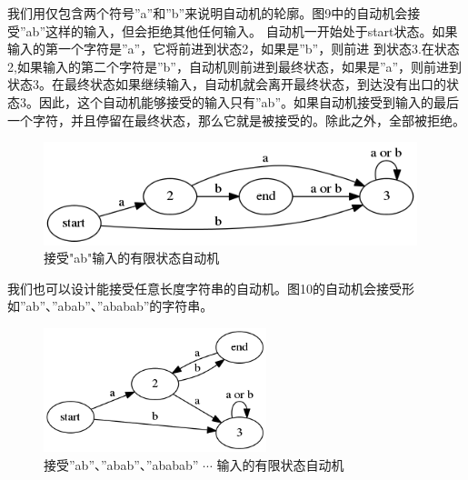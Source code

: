 \documentclass[a4paper]{article}
\begin{document}
\begin{CJK}{UTF8}{gbsn}
我们用仅包含两个符号''a''和''b''来说明自动机的轮廓。图9中的自动机会接受''ab''这样的输入，但会拒绝其他任何输入。
自动机一开始处于start状态。如果输入的第一个字符是''a''，它将前进到状态2，如果是''b''，则前进 到状态3.在状态2,如果输入的第二个字符是''b''，自动机则前进到最终状态，如果是''a''，则前进到状态3。在最终状态如果继续输入，自动机就会离开最终状态，到达没有出口的状态3。因此，这个自动机能够接受的输入只有''ab''。如果自动机接受到输入的最后一个字符，并且停留在最终状态，那么它就是被接受的。除此之外，全部被拒绝。

\begin{figure}[htbp]
\centering\includegraphics[height=3cm]{auto.png}
\caption{接受"ab"输入的有限状态自动机}
\end{figure}

我们也可以设计能接受任意长度字符串的自动机。图10的自动机会接受形如''ab''、''abab''、''ababab''的字符串。

\begin{figure}[htbp]
\centering\includegraphics[height=3.6cm]{auto2.png}
\caption{接受''ab''、''abab''、''ababab'' $\cdots$ 输入的有限状态自动机}
\end{figure}

\end{CJK}
\end{document}
